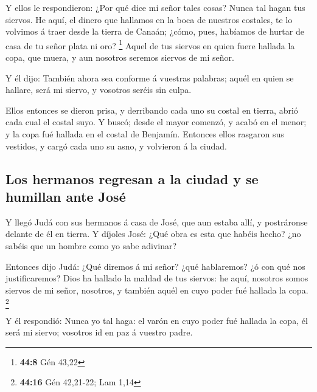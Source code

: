  Y ellos le respondieron: ¿Por qué dice mi señor tales
cosas? Nunca tal hagan tus siervos.  He aquí, el dinero
que hallamos en la boca de nuestros costales, te lo volvimos á traer
desde la tierra de Canaán; ¿cómo, pues, habíamos de hurtar de casa de tu
señor plata ni oro? \footnote{\textbf{44:8} Gén 43,22} 
Aquel de tus siervos en quien fuere hallada la copa, que muera, y aun
nosotros seremos siervos de mi señor.

 Y él dijo: También ahora sea conforme á vuestras
palabras; aquél en quien se hallare, será mi siervo, y vosotros seréis
sin culpa.

 Ellos entonces se dieron prisa, y derribando cada uno su
costal en tierra, abrió cada cual el costal suyo.  Y
buscó; desde el mayor comenzó, y acabó en el menor; y la copa fué
hallada en el costal de Benjamín.  Entonces ellos
rasgaron sus vestidos, y cargó cada uno su asno, y volvieron á la
ciudad.

\hypertarget{los-hermanos-regresan-a-la-ciudad-y-se-humillan-ante-josuxe9}{%
\subsection{Los hermanos regresan a la ciudad y se humillan ante
José}\label{los-hermanos-regresan-a-la-ciudad-y-se-humillan-ante-josuxe9}}

 Y llegó Judá con sus hermanos á casa de José, que aun
estaba allí, y postráronse delante de él en tierra.  Y
díjoles José: ¿Qué obra es esta que habéis hecho? ¿no sabéis que un
hombre como yo sabe adivinar?

 Entonces dijo Judá: ¿Qué diremos á mi señor? ¿qué
hablaremos? ¿ó con qué nos justificaremos? Dios ha hallado la maldad de
tus siervos: he aquí, nosotros somos siervos de mi señor, nosotros, y
también aquél en cuyo poder fué hallada la copa. \footnote{\textbf{44:16}
  Gén 42,21-22; Lam 1,14}

 Y él respondió: Nunca yo tal haga: el varón en cuyo
poder fué hallada la copa, él será mi siervo; vosotros id en paz á
vuestro padre.

